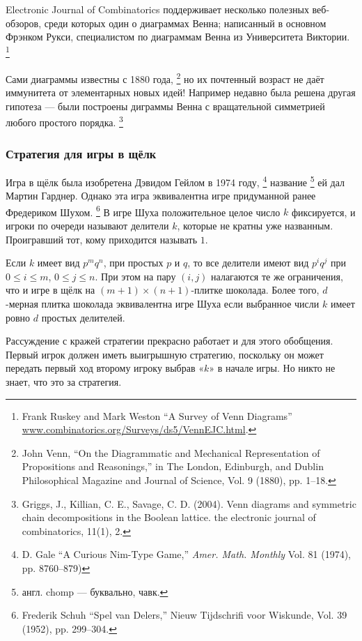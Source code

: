 Electronic Journal of Combinatorics поддерживает несколько полезных веб-обзоров, среди которых один о диаграммах Венна; написанный в основном Фрэнком Рукси, специалистом по диаграммам Венна из Университета Виктории.%
\footnote{Frank Ruskey and Mark Weston ``A Survey of Venn Diagrams'' \href{http://www.combinatorics.org/Surveys/ds5/VennEJC.html}{www.combinatorics.org/Surveys/ds5/VennEJC.html}.}

Сами диаграммы известны с 1880 года,%
\footnote{John Venn, ``On the Diagrammatic and Mechanical Representation of Propositions and Reasonings,'' in The London, Edinburgh, and Dublin Philosophical Magazine and Journal of Science, Vol. 9 (1880), pp. 1--18.}
но их почтенный возраст не даёт иммунитета от элементарных новых идей!
Например недавно была решена другая гипотеза --- были построены диграммы Венна с вращательной симметрией любого простого порядка.%
\footnote{Griggs, J., Killian, C. E., Savage, C. D. (2004). Venn diagrams and symmetric chain decompositions in the Boolean lattice. the electronic journal of combinatorics, 11(1), 2.}

\subsubsection*{Стратегия для игры в щёлк}

Игра в щёлк была изобретена Дэвидом Гейлом в 1974 году,%
\footnote{D. Gale ``A Curious Nim-Type Game,'' \emph{Amer. Math. Monthly} Vol. 81 (1974), pp. 8760--879)}
 название%
\footnote{англ. chomp --- буквально, чавк.}
 ей дал Мартин Гарднер.
Однако эта игра эквивалентна игре придуманной ранее Фредериком Шухом.%
\footnote{Frederik Schuh ``Spel van Delers,'' Nieuw Tijdschrifi voor Wiskunde, Vol. 39 (1952), pp. 299--304.}
В игре Шуха положительное целое число $k$ фиксируется, и игроки по очереди называют делители $k$, которые не кратны уже названным.
Проигравший тот, кому приходится называть $1$.

Если $k$ имеет вид $p^mq^n$, при простых $p$ и $q$, то все делители имеют вид $p^iq^j$ при $0 \le i \le m$, $0 \le j \le n$.
При этом на пару $(i,j)$ налагаются те же ограничения, что и игре в щёлк на $(m+1)\times(n+1)$-плитке шоколада.
Более того, $d$-мерная плитка шоколада эквивалентна игре Шуха если выбранное числи $k$ имеет ровно $d$ простых делителей.

Рассуждение с кражей стратегии прекрасно работает и для этого обобщения.
Первый игрок должен иметь выигрышную стратегию, поскольку он может передать первый ход второму игроку выбрав «$k$» в начале игры.
Но никто не знает, что это за стратегия.

